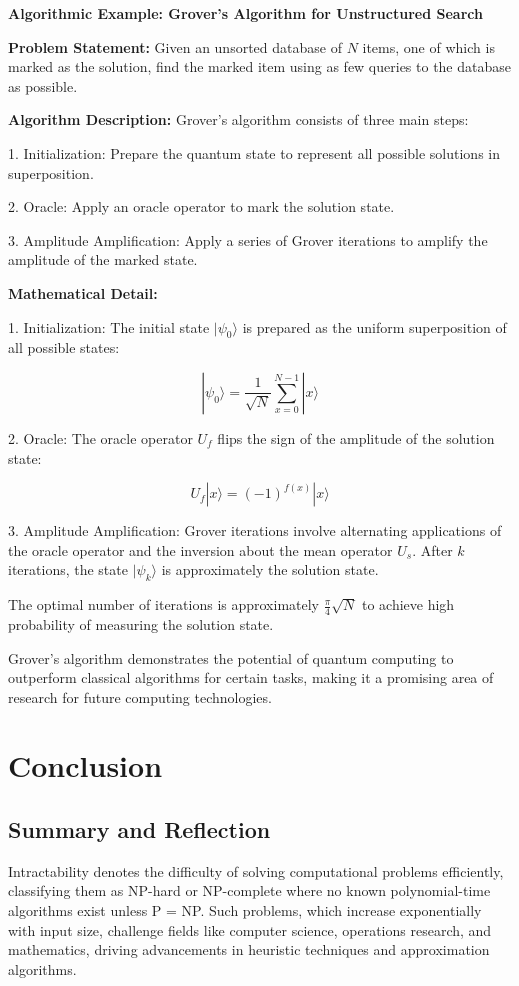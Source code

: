 \textbf{Algorithmic Example: Grover's Algorithm for Unstructured Search}

\textbf{Problem Statement:} Given an unsorted database of \(N\) items, one of which is marked as the solution, find the marked item using as few queries to the database as possible.

\textbf{Algorithm Description:} Grover's algorithm consists of three main steps:

1. Initialization: Prepare the quantum state to represent all possible solutions in superposition.

2. Oracle: Apply an oracle operator to mark the solution state.

3. Amplitude Amplification: Apply a series of Grover iterations to amplify the amplitude of the marked state.

\textbf{Mathematical Detail:}

1. Initialization: The initial state \(|\psi_0\rangle\) is prepared as the uniform superposition of all possible states:

\[
|\psi_0\rangle = \frac{1}{\sqrt{N}} \sum_{x=0}^{N-1} |x\rangle
\]

2. Oracle: The oracle operator \(U_f\) flips the sign of the amplitude of the solution state:

\[
U_f|x\rangle = (-1)^{f(x)}|x\rangle
\]

3. Amplitude Amplification: Grover iterations involve alternating applications of the oracle operator and the inversion about the mean operator \(U_s\). After \(k\) iterations, the state \(|\psi_k\rangle\) is approximately the solution state.

The optimal number of iterations is approximately \(\frac{\pi}{4}\sqrt{N}\) to achieve high probability of measuring the solution state.


Grover's algorithm demonstrates the potential of quantum computing to outperform classical algorithms for certain tasks, making it a promising area of research for future computing technologies.

\section{Conclusion}

\subsection{Summary and Reflection}

Intractability denotes the difficulty of solving computational problems efficiently, classifying them as NP-hard or NP-complete where no known polynomial-time algorithms exist unless P = NP. Such problems, which increase exponentially with input size, challenge fields like computer science, operations research, and mathematics, driving advancements in heuristic techniques and approximation algorithms.

